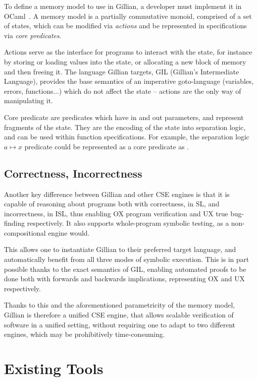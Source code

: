 To define a memory model to use in Gillian, a developer must implement it in OCaml~\cite{ocaml}. A memory model is a partially commutative monoid, comprised of a set of states, which can be modified via \emph{actions} and be represented in specifications via \emph{core predicates}.

Actions serve as the interface for programs to interact with the state, for instance by storing or loading values into the state, or allocating a new block of memory and then freeing it. The language Gillian targets, GIL (Gillian's Intermediate Language), provides the base semantics of an imperative goto-language (variables, errors, functions...) which do not affect the state -- actions are the only way of manipulating it.

Core predicate are predicates which have in and out parameters, and represent fragments of the state. They are the encoding of the state into separation logic, and can be used within function specifications. For example, the separation logic $a \mapsto x$ predicate could be represented as a core predicate as .

\subsection{Correctness, Incorrectness}

Another key difference between Gillian and other CSE engines is that it is capable of reasoning about programs both with correctness, in SL, and incorrectness, in ISL, thus enabling OX program verification and UX true bug-finding respectively. It also supports whole-program symbolic testing, as a non-compositional engine would.

This allows one to instantiate Gillian to their preferred target language, and automatically benefit from all three modes of symbolic execution. This is in part possible thanks to the exact \cite{exactsl} semantics of GIL, enabling automated proofs to be done both with forwards and backwards implications, representing OX and UX respectively.

Thanks to this and the aforementioned parametricity of the memory model, Gillian is therefore a unified CSE engine, that allows scalable verification of software in a unified setting, without requiring one to adapt to two different engines, which may be prohibitively time-consuming.

\section{Existing Tools}

